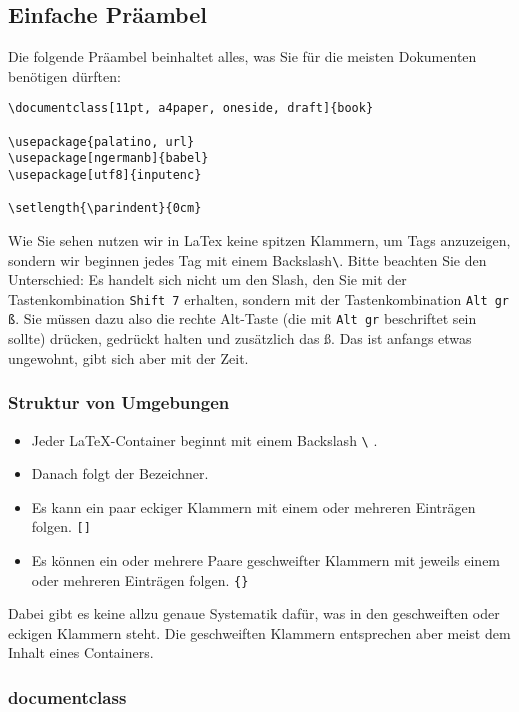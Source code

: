 \subsection{Einfache Präambel}

Die folgende Präambel beinhaltet alles, was Sie für die meisten Dokumenten benötigen dürften:

\begin{verbatim}
\documentclass[11pt, a4paper, oneside, draft]{book}

\usepackage{palatino, url}
\usepackage[ngermanb]{babel}
\usepackage[utf8]{inputenc}

\setlength{\parindent}{0cm}
\end{verbatim}

Wie Sie sehen nutzen wir in LaTex keine spitzen Klammern, um Tags anzuzeigen, sondern wir beginnen jedes \glqq{}Tag\grqq{} mit einem Backslash\verb|\|. Bitte beachten Sie den Unterschied: Es handelt sich nicht um den Slash, den Sie mit der Tastenkombination \verb|Shift 7| erhalten, sondern mit der Tastenkombination \verb|Alt gr ß|. Sie müssen dazu also die rechte Alt-Taste (die mit \verb|Alt gr| beschriftet sein sollte) drücken, gedrückt halten und zusätzlich das ß. Das ist anfangs etwas ungewohnt, gibt sich aber mit der Zeit.\\

\subsubsection{Struktur von Umgebungen}

\begin{itemize}
	\item Jeder LaTeX-Container beginnt mit einem Backslash \verb|\| .
	\item Danach folgt der Bezeichner.
	\item Es kann ein paar eckiger Klammern mit einem oder mehreren Einträgen folgen. \verb|[]|
	\item Es können ein oder mehrere Paare geschweifter Klammern mit jeweils einem oder mehreren Einträgen folgen. \verb|{}|
\end{itemize}

Dabei gibt es keine allzu genaue Systematik dafür, was in den geschweiften oder eckigen Klammern steht. Die geschweiften Klammern entsprechen aber meist dem Inhalt eines Containers.\\

\subsubsection{documentclass}

